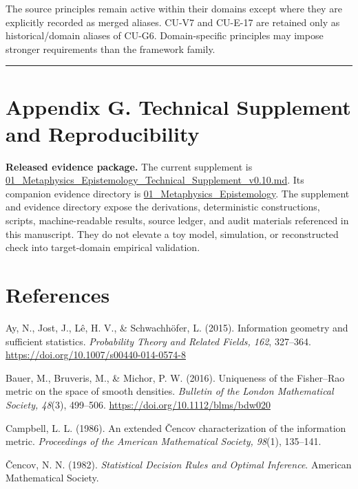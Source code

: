 \documentclass[
  11pt,
]{article}
\begin{document}
The source principles remain active within their domains except where
they are explicitly recorded as merged aliases. CU-V7 and CU-E-17 are
retained only as historical/domain aliases of CU-G6. Domain-specific
principles may impose stronger requirements than the framework family.

\begin{center}\rule{0.5\linewidth}{0.5pt}\end{center}

\section{Appendix G. Technical Supplement and
Reproducibility}\label{appendix-g.-technical-supplement-and-reproducibility}

\textbf{Released evidence package.} The current supplement is
\href{../supplements/01_Metaphysics_Epistemology_Technical_Supplement_v0.10.md}{01\_Metaphysics\_Epistemology\_Technical\_Supplement\_v0.10.md}.
Its companion evidence directory is
\href{../evidence/01_Metaphysics_Epistemology/README.md}{01\_Metaphysics\_Epistemology}.
The supplement and evidence directory expose the derivations,
deterministic constructions, scripts, machine-readable results, source
ledger, and audit materials referenced in this manuscript. They do not
elevate a toy model, simulation, or reconstructed check into
target-domain empirical validation.

\section{References}\label{references}

Ay, N., Jost, J., Lê, H. V., \& Schwachhöfer, L. (2015). Information
geometry and sufficient statistics. \emph{Probability Theory and Related
Fields, 162}, 327--364. \url{https://doi.org/10.1007/s00440-014-0574-8}

Bauer, M., Bruveris, M., \& Michor, P. W. (2016). Uniqueness of the
Fisher--Rao metric on the space of smooth densities. \emph{Bulletin of
the London Mathematical Society, 48}(3), 499--506.
\url{https://doi.org/10.1112/blms/bdw020}

Campbell, L. L. (1986). An extended Čencov characterization of the
information metric. \emph{Proceedings of the American Mathematical
Society, 98}(1), 135--141.

Čencov, N. N. (1982). \emph{Statistical Decision Rules and Optimal
Inference}. American Mathematical Society.
\end{document}
